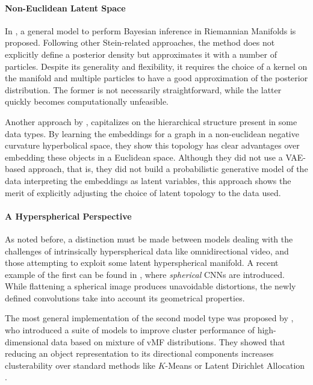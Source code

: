 \documentclass[letterpaper]{article}
\begin{document}
\label{par:non-euclidean-latent-space}
\paragraph{Non-Euclidean Latent Space}
In \cite{riemann-stein}, a general model to perform Bayesian inference in Riemannian Manifolds is proposed. Following other Stein-related approaches, the method does not explicitly define a posterior density but approximates it with a number of particles. Despite its generality and flexibility, it requires the choice of a kernel on the manifold and multiple particles to have a good approximation of the posterior distribution. The former is not necessarily straightforward, while the latter quickly becomes computationally unfeasible. 

Another approach by \cite{nickel2017poincare}, capitalizes on the hierarchical structure present in some data types. By learning the embeddings for a graph in a non-euclidean negative curvature hyperbolical space, they show this topology has clear advantages over embedding these objects in a Euclidean space. Although they did not use a VAE-based approach, that is, they did not build a probabilistic generative model of the data interpreting the embeddings as latent variables, this approach shows the merit of explicitly adjusting the choice of latent topology to the data used.

\label{par:hyperspherical-perspective}
\paragraph{A Hyperspherical Perspective}
As noted before, a distinction must be made between models dealing with the challenges of intrinsically hyperspherical data like omnidirectional video, and those attempting to exploit some latent hyperspherical manifold. A recent example of the first can be found in \cite{s.2018spherical}, where \textit{spherical} CNNs are introduced. While flattening a spherical image produces unavoidable distortions, the newly defined convolutions take into account its geometrical properties. 

The most general implementation of the second model type was proposed by \cite{gopal2014mises}, who introduced a suite of models to improve cluster performance of high-dimensional data based on mixture of vMF distributions. They showed that reducing an object representation to its directional components increases clusterability over standard methods like $K$-Means or Latent Dirichlet Allocation \citep{blei2003latent}.
\end{document}
